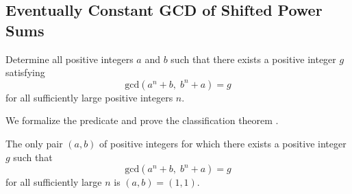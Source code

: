 
\subsection{Eventually Constant GCD of Shifted Power Sums}

\begin{problemstatement}
Determine all positive integers \(a\) and \(b\) such that there exists a positive integer \(g\) satisfying
\[
  \text{gcd}(a^n+b,\; b^n+a)=g
\]
for all sufficiently large positive integers \(n\).
\end{problemstatement}

We formalize the predicate
 and prove the
classification theorem
.

\begin{theorem}
The only pair \((a,b)\) of positive integers for which there exists a positive
integer \(g\) such that
\[
  \text{gcd}(a^n+b,\; b^n+a)=g
\]
for all sufficiently large \(n\) is \((a,b)=(1,1)\).
\end{theorem}

